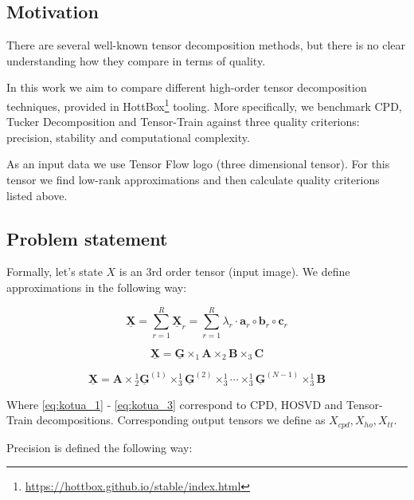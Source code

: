 \documentclass[../../main.tex]{subfiles}
\begin{document}
\subsection{Motivation}
There are several well-known tensor decomposition methods, but there is no clear understanding how they compare in terms of quality. 

In this work we aim to compare different high-order tensor decomposition techniques, provided in HottBox\footnote{\url{https://hottbox.github.io/stable/index.html}} tooling. More specifically, we benchmark CPD, Tucker Decomposition and Tensor-Train against three quality criterions: precision, stability and computational complexity.

As an input data we use Tensor Flow logo (three dimensional tensor). For this tensor we find low-rank approximations and then calculate quality criterions listed above.


\subsection{Problem statement}

Formally, let's state $X$ is an 3rd order tensor (input image). We define approximations in the following way:


\begin{equation} \label{eq:kotua_1}
\underline{\mathbf{X}}=\sum_{r=1}^{R} \underline{\mathbf{X}}_{r}=\sum_{r=1}^{R} \lambda_{r} \cdot \mathbf{a}_{r} \circ \mathbf{b}_{r} \circ \mathbf{c}_{r} \end{equation}


\begin{equation} \label{eq:kotua_2}
\underline{\mathbf{X}}=\underline{\mathbf{G}} \times_{1} \mathbf{A} \times_{2} \mathbf{B} \times_{3} \mathbf{C}\end{equation}


\begin{equation} \label{eq:kotua_3}
\underline{\mathbf{X}}=\mathbf{A} \times{ }_{2}^{1} \underline{\mathbf{G}}^{(1)} \times_{3}^{1} \underline{\mathbf{G}}^{(2)} \times_{3}^{1} \cdots \times_{3}^{1} \underline{\mathbf{G}}^{(N-1)} \times_{3}^{1} \mathbf{B}\end{equation}

Where \ref{eq:kotua_1} - \ref{eq:kotua_3} correspond to CPD, HOSVD and Tensor-Train decompositions. Corresponding output tensors we define as $X_{cpd}, X_{ho}, X_{tt}$.

Precision is defined the following way:
\end{document}
